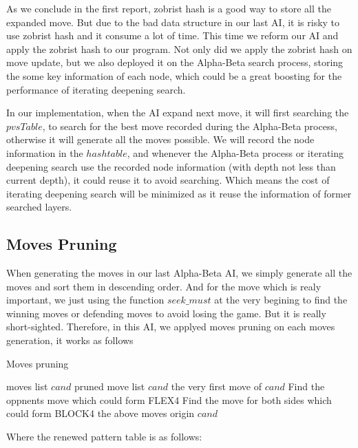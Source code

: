 \documentclass[a4paper, 12pt]{article} %
\begin{document}
\begin{multicols}{2}
		As we conclude in the first report, zobrist hash is a good way to store all the expanded move. But due to the bad data structure in our last AI, it is risky to use zobrist hash and it consume a lot of time. This time we reform our AI and apply the zobrist hash to our program. Not only did we apply the zobrist hash on move update, but we also deployed it on the Alpha-Beta search process, storing the some key information of each node, which could be a great boosting for the performance of iterating deepening search.
		
		In our implementation, when the AI expand next move, it will first searching the $pvsTable$, to search for the best move recorded during the Alpha-Beta process, otherwise it will generate all the moves possible. We will record the node information in the $hashtable$, and whenever the Alpha-Beta process or iterating deepening search use the recorded node information (with depth not less than current depth), it could reuse it to avoid searching. Which means the cost of iterating deepening search will be minimized as it reuse the information of former searched layers.
		
		\subsection{Moves Pruning}
		When generating the moves in our last Alpha-Beta AI, we simply generate all the moves and sort them in descending order. And for the move which is realy important, we just using the function $seek\_must$ at the very begining to find the winning moves or defending moves to avoid losing the game. But it is really short-sighted. Therefore, in this AI, we applyed moves pruning on each moves generation, it works as follows
		
		\begin{algorithm}[H]
			\caption{Moves pruning}
			\begin{algorithmic}[1]
				\Require moves list $cand$
				\Ensure pruned move list $cand$
					\Return the very first move of $cand$
					\State Find the oppnents move which could form FLEX4
					\State Find the move for both sides which could form BLOCK4
					\Return the above moves
				\EndIf
				\Return origin $cand$
			\end{algorithmic}
		\end{algorithm}
	
		Where the renewed pattern table is as follows:
		

\end{multicols}
\end{document}

